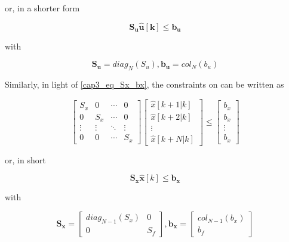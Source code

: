 \noindent
or, in a shorter form

\noindent
\begin{equation}
	\mathbf{S_u \hat{u}[k]} \leq \mathbf{b_u}
\end{equation}

\noindent
with

\noindent
\begin{equation}
	\mathbf{S_u} = diag_N(S_u), \mathbf{b_u} = col_N(b_u)
\end{equation}

Similarly, in light of \eqref{cap3_eq_Sx_bx}, the constraints on  can be written as

\begin{equation}
	\left[
		\begin{matrix}
			S_x & 0 & \cdots & 0 \\
			0 & S_x & \cdots & 0 \\
			\vdots & \vdots & \ddots & \vdots \\
			0 & 0 & \cdots & S_x
		\end{matrix}
	\right]
	\left[
		\begin{matrix}
			\hat{x}[k + 1 | k] \\
			\hat{x}[k + 2 | k] \\
			\vdots \\
			\hat{x}[k + N | k]
		\end{matrix}
	\right]
	\leq
	\left[
		\begin{matrix}
			b_x \\
			b_x \\
			\vdots \\
			b_x
		\end{matrix}
	\right]
\end{equation}

\noindent
or, in short

\noindent
\begin{equation}
	\label{cap3_sx_x_le_bx}
	\mathbf{S_x}\mathbf{\hat{x}}[k] \leq \mathbf{b_x}
\end{equation}

\noindent
with

\noindent
\begin{equation}
	\mathbf{S_x} = 
	\left[
		\begin{matrix}
			diag_{N-1}(S_x) & 0 \\
			0 & S_f
		\end{matrix}
	\right], \mathbf{b_x} = 
	\left[
		\begin{matrix}
			col_{N-1}(b_x) \\
			b_f
		\end{matrix}
	\right]
\end{equation}
